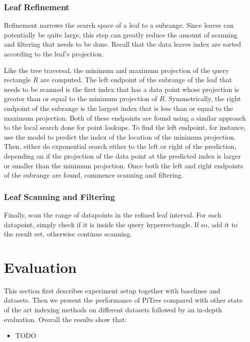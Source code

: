 \documentclass[sigconf,10pt]{acmart}
\begin{document}
\subsubsection{Leaf Refinement}
Refinement narrows the search space of a leaf to a subrange. Since leaves can
potentially be quite large, this step can greatly reduce the amount of 
scanning and filtering that needs to be done. Recall
that the data leaves index are sorted according to the leaf's projection.

Like the tree traversal, the minimum and maximum projection of the query 
rectangle $R$ are computed. 
The left endpoint of the subrange of the leaf that needs to be scanned
is the first index that has a data point whose projection is greater than or equal to the minimum
projection of $R$. Symmetrically, the right endpoint of the subrange is the 
largest index that is less than or equal to the maximum projection.
Both of these endpoints are found using a similar approach to the local
search done for point lookups. To find the left endpoint, for instance,
use the model to predict the index of the location of the minimum projection.
Then, either do exponential search either to the left or right of the prediction,
depending on if the projection of the data point at the predicted index is
larger or smaller than the minimum projection. Once both the left
and right endpoints of the subrange are found, commence scanning and filtering.

\subsubsection{Leaf Scanning and Filtering}

Finally, scan the range of datapoints in the refined leaf interval.
For each datapoint, simply check if it is inside the query hyperrectangle.
If so, add it to the result set, otherwise continue scanning.

\section{Evaluation}

This section first describes experiment setup together with baselines and datasets. 
Then we present the performance of PiTree compared with other state of the art 
indexing methods on different datasets followed by an in-depth evaluation. 
Overall the results show that:
\begin{itemize}
    \item TODO
\end{itemize}
\end{document}
